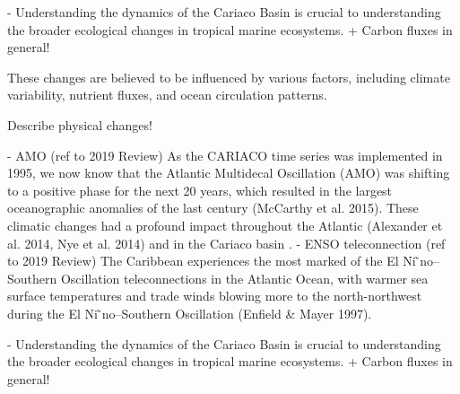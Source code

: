 \documentclass[draft]{agujournal2019}
\begin{document}
    - Understanding the dynamics of the Cariaco Basin is crucial to understanding the broader ecological changes in tropical marine ecosystems. + Carbon fluxes in general!







    







    
    These changes are believed to be influenced by various factors, including climate variability, nutrient fluxes, and ocean circulation patterns.

    Describe physical changes!

    - AMO (ref to 2019 Review)
    As the CARIACO time series was implemented in 1995, we now know that the Atlantic Multidecal Oscillation (AMO) was shifting to a positive phase for the next 20 years, which resulted in the largest oceanographic anomalies of the last century (McCarthy et al. 2015). These climatic changes had a profound impact throughout the Atlantic (Alexander et al. 2014, Nye et al. 2014) and in the Cariaco basin \cite{taylor_ecosystem_2012,pinckney_phytoplankton_2015}.
    - ENSO teleconnection (ref to 2019 Review)
    The Caribbean experiences the most marked of the El Ni  ̃no–Southern Oscillation teleconnections in the Atlantic Ocean, with warmer sea surface temperatures and trade winds blowing more to the north-northwest during the El Ni  ̃no–Southern Oscillation (Enfield & Mayer 1997).

     - Understanding the dynamics of the Cariaco Basin is crucial to understanding the broader ecological changes in tropical marine ecosystems. + Carbon fluxes in general!


\end{document}
